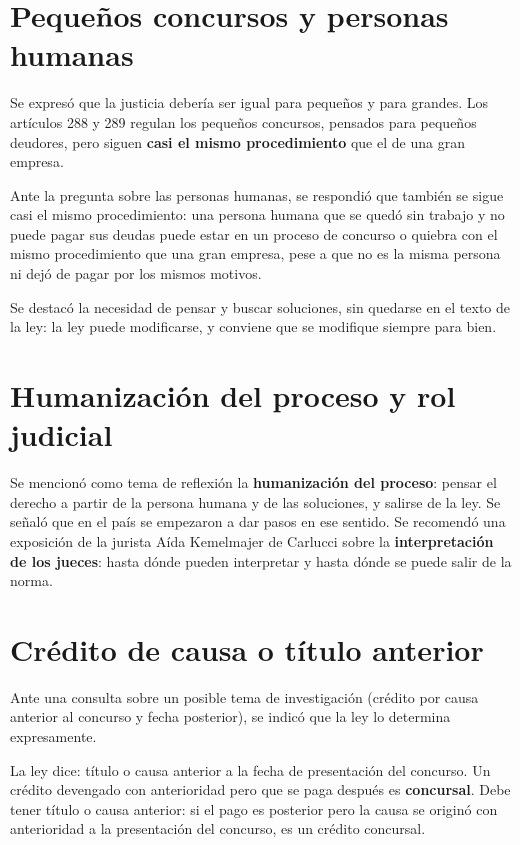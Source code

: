 \documentclass[12pt,oneside]{book}
\begin{document}
\section{Pequeños concursos y personas humanas}

Se expresó que la justicia debería ser igual para pequeños y para grandes. Los artículos 288 y 289 regulan los pequeños concursos, pensados para pequeños deudores, pero siguen \textbf{casi el mismo procedimiento} que el de una gran empresa.

Ante la pregunta sobre las personas humanas, se respondió que también se sigue casi el mismo procedimiento: una persona humana que se quedó sin trabajo y no puede pagar sus deudas puede estar en un proceso de concurso o quiebra con el mismo procedimiento que una gran empresa, pese a que no es la misma persona ni dejó de pagar por los mismos motivos.

\begin{note}
Se destacó la necesidad de pensar y buscar soluciones, sin quedarse en el texto de la ley: la ley puede modificarse, y conviene que se modifique siempre para bien.
\end{note}

\section{Humanización del proceso y rol judicial}

Se mencionó como tema de reflexión la \textbf{humanización del proceso}: pensar el derecho a partir de la persona humana y de las soluciones, y salirse de la ley. Se señaló que en el país se empezaron a dar pasos en ese sentido. Se recomendó una exposición de la jurista Aída Kemelmajer de Carlucci sobre la \textbf{interpretación de los jueces}: hasta dónde pueden interpretar y hasta dónde se puede salir de la norma.

\section{Crédito de causa o título anterior}

Ante una consulta sobre un posible tema de investigación (crédito por causa anterior al concurso y fecha posterior), se indicó que la ley lo determina expresamente.

\begin{important}
La ley dice: título o causa anterior a la fecha de presentación del concurso. Un crédito devengado con anterioridad pero que se paga después es \textbf{concursal}. Debe tener título o causa anterior: si el pago es posterior pero la causa se originó con anterioridad a la presentación del concurso, es un crédito concursal.
\end{important}
\end{document}
